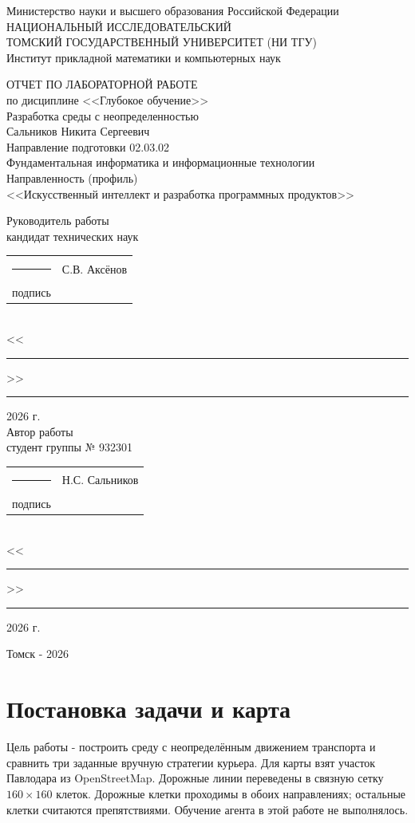 \documentclass[12pt,a4paper]{article}
\begin{document}
\begin{titlepage}
\begin{center}
Министерство науки и высшего образования Российской Федерации\\
НАЦИОНАЛЬНЫЙ ИССЛЕДОВАТЕЛЬСКИЙ\\
ТОМСКИЙ ГОСУДАРСТВЕННЫЙ УНИВЕРСИТЕТ (НИ ТГУ)\\
Институт прикладной математики и компьютерных наук

\vspace{5cm}
ОТЧЕТ ПО ЛАБОРАТОРНОЙ РАБОТЕ\\[0.3cm]
по дисциплине <<Глубокое обучение>>\\[0.4cm]
{\large Разработка среды с неопределенностью}\\[0.5cm]
Сальников Никита Сергеевич\\[0.3cm]
Направление подготовки 02.03.02\\
Фундаментальная информатика и информационные технологии\\
Направленность (профиль)\\
<<Искусственный интеллект и разработка программных продуктов>>

\vspace{2.5cm}
\begin{flushright}
Руководитель работы\\
кандидат технических наук\\
\begin{tabular}{c l}
\rule{3cm}{0.4pt} & С.В. Аксёнов\\
{\small подпись} &
\end{tabular}\\
<<\rule{0.7cm}{0.4pt}>> \rule{2.5cm}{0.4pt} 2026 г.\\[0.8cm]
Автор работы\\
студент группы № 932301\\
\begin{tabular}{c l}
\rule{3cm}{0.4pt} & Н.С. Сальников\\
{\small подпись} &
\end{tabular}\\
<<\rule{0.7cm}{0.4pt}>> \rule{2.5cm}{0.4pt} 2026 г.
\end{flushright}

\vfill
Томск - 2026
\end{center}
\end{titlepage}

\section{Постановка задачи и карта}
Цель работы - построить среду с неопределённым движением транспорта и сравнить три заданные вручную стратегии курьера. Для карты взят участок Павлодара из OpenStreetMap. Дорожные линии переведены в связную сетку $160\times160$ клеток. Дорожные клетки проходимы в обоих направлениях; остальные клетки считаются препятствиями. Обучение агента в этой работе не выполнялось.
\end{document}
